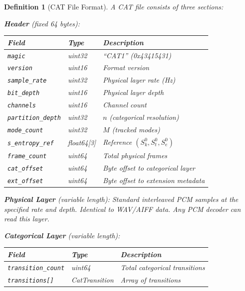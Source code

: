 \documentclass[twocolumn,10pt]{article}
\newtheorem{definition}[theorem]{Definition}
\theoremstyle{remark}
\newcommand{\Sk}{S_k}
\newcommand{\St}{S_t}
\newcommand{\Se}{S_e}
\begin{document}
\begin{definition}[CAT File Format]
\label{def:cat_format}
A CAT file consists of three sections:

\textbf{Header} (fixed 64 bytes):
\begin{center}
\begin{tabular}{llp{5cm}}
\toprule
Field & Type & Description \\
\midrule
\texttt{magic} & uint32 & ``CAT1'' (0x43415431) \\
\texttt{version} & uint16 & Format version \\
\texttt{sample\_rate} & uint32 & Physical layer rate (Hz) \\
\texttt{bit\_depth} & uint16 & Physical layer depth \\
\texttt{channels} & uint16 & Channel count \\
\texttt{partition\_depth} & uint32 & $n$ (categorical resolution) \\
\texttt{mode\_count} & uint32 & $M$ (tracked modes) \\
\texttt{s\_entropy\_ref} & float64[3] & Reference $(\Sk^0, \St^0, \Se^0)$ \\
\texttt{frame\_count} & uint64 & Total physical frames \\
\texttt{cat\_offset} & uint64 & Byte offset to categorical layer \\
\texttt{ext\_offset} & uint64 & Byte offset to extension metadata \\
\bottomrule
\end{tabular}
\end{center}

\textbf{Physical Layer} (variable length):
Standard interleaved PCM samples at the specified rate and depth. Identical to WAV/AIFF data. Any PCM decoder can read this layer.

\textbf{Categorical Layer} (variable length):
\begin{center}
\begin{tabular}{llp{4.5cm}}
\toprule
Field & Type & Description \\
\midrule
\texttt{transition\_count} & uint64 & Total categorical transitions \\
\texttt{transitions[]} & CatTransition & Array of transitions \\
\bottomrule
\end{tabular}
\end{center}


\end{definition}
\end{document}
